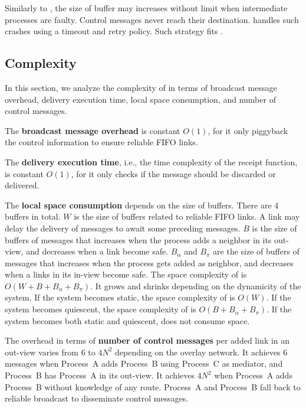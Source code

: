 Similarly to \PCBROADCAST, the size of buffer may increases without limit when
intermediate processes are faulty. Control messages never reach their
destination. \PCBROADCAST handles such crashes using a timeout and retry
policy. Such strategy fits \RPCBROADCAST.


\subsection{Complexity}
\label{subsec:complexity}

In this section, we analyze the complexity of \RPCBROADCAST in terms of
broadcast message overhead, delivery execution time, local space consumption,
and number of control messages. 

\noindent The \textbf{broadcast message overhead} is constant $O(1)$, for it
only piggyback the control information to ensure reliable FIFO links.

\noindent The \textbf{delivery execution time}, i.e., the time complexity of the
receipt function, is constant $O(1)$, for it only checks if the message should
be discarded or delivered.

\noindent The \textbf{local space consumption} depends on the size of
buffers. There are 4 buffers in total. $W$ is the size of buffers related to
reliable FIFO links. A link may delay the delivery of messages to await some
preceding messages. $B$ is the size of buffers of messages that increases when
the process adds a neighbor in its out-view, and decreases when a link become
safe. $B_\alpha$ and $B_\pi$ are the size of buffers of messages that increases
when the process gets added as neighbor, and decreases when a links in its
in-view become safe. The space complexity of \RPCBROADCAST is
$O(W + B + B_\alpha + B_\pi)$. It grows and shrinks depending on the dynamicity
of the system. If the system becomes static, the space complexity of
\RPCBROADCAST is $O(W)$. If the system becomes quiescent, the space complexity
of \RPCBROADCAST is $O(B + B_\alpha + B_\pi)$.  If the system becomes both
static and quiescent, \RPCBROADCAST does not consume
space. 

\noindent The overhead in terms of \textbf{number of control messages} per added
link in an out-view varies from $6$ to $4N^2$ depending on the overlay
network. It achieves $6$ messages when Process~A adds Process~B using Process~C
as mediator, and Process~B has Process~A in its out-view. It achieves $4N^2$
when Process~A adds Process~B without knowledge of any route. Process~A and
Process~B fall back to reliable broadcast to disseminate control
messages. 

